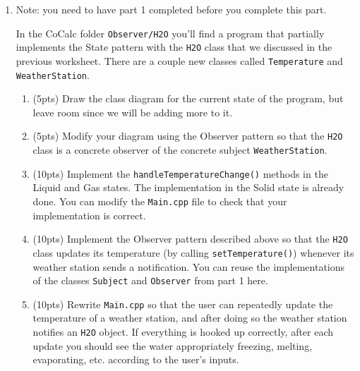\documentclass[11pt]{article}
\newlength{\up}\setlength{\up}{-\baselineskip}
\begin{document}
\begin{enumerate}
  \vfill

\newpage

  \item Note: you need to have part 1 completed before you complete this part.

  In the CoCalc folder \texttt{Observer/H2O} you'll find a program that partially implements the State pattern with the \texttt{H2O} class that we discussed in the previous worksheet. There are a couple new classes called \texttt{Temperature} and \texttt{WeatherStation}.

  \begin{enumerate}

    \item (5pts) Draw the class diagram for the current state of the program, but leave room since we will be adding more to it. 

    \item (5pts) Modify your diagram using the Observer pattern so that the \texttt{H2O} class is a concrete observer of the concrete subject \texttt{WeatherStation}. 

    \vfill

    \item (10pts) Implement the \texttt{handleTemperatureChange()} methods in the Liquid and Gas states. The implementation in the Solid state is already done. You can modify the \texttt{Main.cpp} file to check that your implementation is correct. 

    \item (10pts) Implement the Observer pattern described above so that the \texttt{H2O} class updates its temperature (by calling \texttt{setTemperature()}) whenever its weather station sends a notification. You can reuse the implementations of the classes \texttt{Subject} and \texttt{Observer} from part 1 here. 

    \item (10pts) Rewrite \texttt{Main.cpp} so that the user can repeatedly update the temperature of a weather station, and after doing so the weather station notifies an \texttt{H2O} object. If everything is hooked up correctly, after each update you should see the water appropriately freezing, melting, evaporating, etc. according to the user's inputs.



  \end{enumerate}


\end{enumerate}
\end{document}
